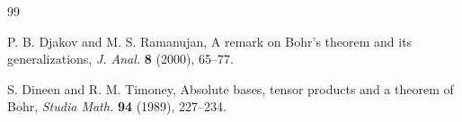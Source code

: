 \documentclass[a4paper,11pt, reqno]{amsart}
\theoremstyle{definition}
\begin{document}
\begin{thebibliography}{99}
	
	 {\sc P. B. Djakov} and {\sc M. S. Ramanujan}, A remark on Bohr's theorem and its generalizations, \textit{J. Anal.} \textbf{8} (2000), 65--77.
	
	 {\sc S. Dineen} and {\sc R. M. Timoney}, Absolute bases, tensor products and a theorem of Bohr, \textit{Studia Math.} \textbf{94} (1989), 227--234.
	
	
	
	
	
	
	
	
	
	
	
	
	

\end{thebibliography}
\end{document}
